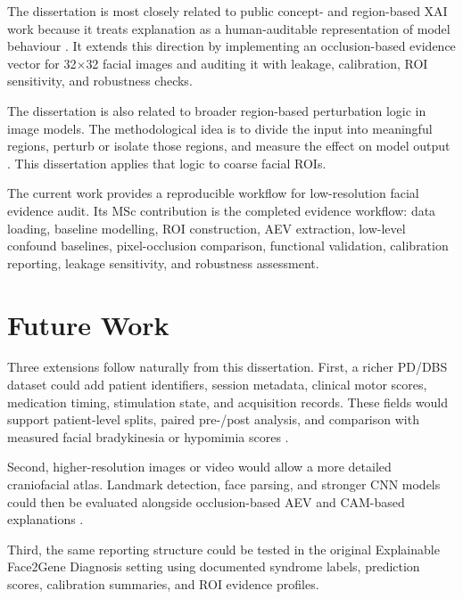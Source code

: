 The dissertation is most closely related to public concept- and region-based XAI work because it treats explanation as a human-auditable representation of model behaviour    . It extends this direction by implementing an occlusion-based evidence vector for 32$\times$32 facial images and auditing it with leakage, calibration, ROI sensitivity, and robustness checks.


The dissertation is also related to broader region-based perturbation logic in image models. The methodological idea is to divide the input into meaningful regions, perturb or isolate those regions, and measure the effect on model output   . This dissertation applies that logic to coarse facial ROIs.


The current work provides a reproducible workflow for low-resolution facial evidence audit. Its MSc contribution is the completed evidence workflow: data loading, baseline modelling, ROI construction, AEV extraction, low-level confound baselines, pixel-occlusion comparison, functional validation, calibration reporting, leakage sensitivity, and robustness assessment.


\section{Future Work}

Three extensions follow naturally from this dissertation. First, a richer PD/DBS dataset could add patient identifiers, session metadata, clinical motor scores, medication timing, stimulation state, and acquisition records. These fields would support patient-level splits, paired pre-/post analysis, and comparison with measured facial bradykinesia or hypomimia scores  .


Second, higher-resolution images or video would allow a more detailed craniofacial atlas. Landmark detection, face parsing, and stronger CNN models could then be evaluated alongside occlusion-based AEV and CAM-based explanations    .


Third, the same reporting structure could be tested in the original Explainable Face2Gene Diagnosis setting using documented syndrome labels, prediction scores, calibration summaries, and ROI evidence profiles.


